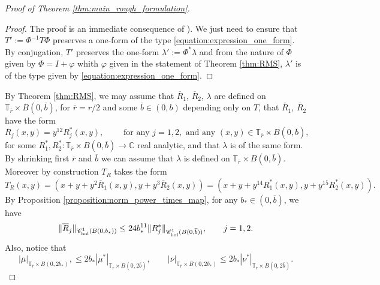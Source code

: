 \documentclass[10pt]{article}
\newcommand{\C}{\mathbb{C}}
\newcommand{\T}{\mathbb{T}}
\newcommand{\TT}{\mathbb{T}}
\begin{document}
\begin{proof}[Proof of Theorem \ref{thm:main_rough_formulation}]
\begin{proof}
    The proof is an immediate consequence of \cite[Theorem 3]{MartinRamirezTamarit}). We just need to ensure that $T':=\Phi^{-1}T\Phi$ preserves a one-form of the type \eqref{equation:expression_one_form}. 
    By conjugation, $T'$ preserves the one-form $\lambda':=\Phi^\ast\lambda$ 
    and from the nature of $\Phi$ given by $\Phi=I+\varphi$ whith $\varphi$ given in the statement of Theorem \ref{thm:RMS}, 
    $\lambda'$ is of the type given by \eqref{equation:expression_one_form}.
\end{proof}

By Theorem \ref{thm:RMS}, we may assume that $\overline R_1$, $\overline R_2$, $\lambda$ are defined on $\TT_{\overline{r}}\times B(0, \overline b)$, for $\overline{r}=r/2$ and some $\overline{b}\in(0,b)$ depending only on $T$, that $\overline R_1$, $\overline R_2$ have the form
\[
\overline R_j(x,y) = y^{12} R_j^{\ast}(x,y), \qquad \text{ for any } j=1,2,  \text{ and any } (x,y)\in\TT_{\overline{r}}\times B(0,\overline{b}),
\]
for some $R_1^*, R_2^* : \TT_{\overline{r}}\times B(0,\overline{b}) \to \C$ real analytic, and that $\lambda$ is of the same form. 
By shrinking first $\overline r$ and $\overline b$ we can assume that $\lambda$ is defined on $\TT_{\overline r}\times B(0,\overline b)$.
Moreover by construction $T_R$ takes the form
\[ T_R(x, y) = (x + y + y^2\overline R_1(x, y), y + y^3\overline R_2(x, y)) =(x + y + y^{14}R_1^*(x, y), y + y^{15}R_2^*(x, y)). \]
By Proposition \ref{proposition:norm_power_times_map}, for any $b_{\ast}\in(0,\overline{b})$, we have
\begin{equation}
\label{eq:rescaling_bound}
\|\overline R_j\|_{\mathscr{C}^1_{\textup{hol}}(B(0, b_{\ast}))} \leq 24b_{\ast}^{11} \|R_j^{\ast}\|_{\mathscr{C}^1_{\textup{hol}}(B(0, \overline{b}))}, \qquad j = 1, 2.
\end{equation}
Also, notice that
\begin{equation}
\label{eq:rescaling_bound_form}
| \overline \mu|_{\T_{\overline r}\times B(0,2b_*)},  \leq 2b_*   | \mu^*|_{\T_{\overline r}\times B(0,2\overline b)}, 
\qquad 
| \overline \nu|_{\T_{\overline r}\times B(0,2b_*)} \leq 2b_*| \nu^*|_{\T_{\overline r}\times B(0,2\overline b)}.
\end{equation}


\end{proof}
\end{document}
